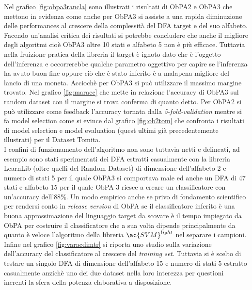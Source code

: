 Nel grafico \ref{fig:obpa3rancla} sono illustrati i risultati di \ac{ObPA}2 e \ac{ObPA}3 che mettono in evidenza come anche per \ac{ObPA}3 si assiste a una rapida diminuzione delle performances al crescere della complessità del \ac{DFA} target e del suo alfabeto. \\
Facendo un'analisi critica dei risultati si potrebbe concludere che anche il migliore degli algoritmi cioè \ac{ObPA}3 oltre 10 stati e alfabeto 5 non è più efficace. Tuttavia nella fruizione pratica della libreria il target è ignoto dato che è l'oggetto dell'inferenza e occorrerebbe qualche parametro oggettivo per capire se l'inferenza ha avuto buon fine oppure ciò che è stato inferito è a malapena migliore del lancio di una moneta.  Acciochè per \ac{ObPA}3 si può utilizzare il massimo margine trovato. Nel grafico \ref{fig:maracc} che mette in relazione l'accuracy di \ac{ObPA}3 sul random dataset con il margine  si trova conferma di quanto detto. Per \ac{ObPA}2 si può utilizzare come feedback l'accuracy tornata dalla \textit{5-fold-validation} mentre si fa model selection come si evince dal grafico \ref{fig:ob2tom} che confronta i risultati di model  selection e model evaluation (quest ultimi già precedentemente illustrati) per il Dataset Tomita. \\
I confini di funzionamento dell'algoritmo non sono tuttavia netti e delineati, ad esempio sono stati sperimentati dei \ac{DFA} estratti casualmente con la libreria LearnLib (oltre quelli del Random Dataset) di dimensione dell'alfabeto 2 e numero di stati 5 per il quale \ac{ObPA}3 si comportava male ed anche un \ac{DFA} di 47 stati e alfabeto 15 per il quale \ac{ObPA} 3 riesce a creare un classificatore con un'accuracy dell'$88\%$. Un modo empirico anche se privo di fondamento scientifico per rendersi conto  in \textit{release version} di \ac{ObPA} se il classificatore inferito è una buona approssimazione del linguaggio target da scovare è il tempo impiegato da \ac{ObPA} per costruire il classificatore che a sua volta dipende principalmente da quanto è veloce l'algoritmo della libreria $\ac{SVM}^{light}$ nel separare i campioni.\\
Infine nel grafico \ref{fig:varacdimtr} si riporta uno studio sulla variazione dell'accuracy del classificatore al crescere del \textit{training set}. Tuttavia si è scelto di testare un singolo \ac{DFA} di dimensione dell'alfabeto 15 e numero di stati 5 estratto casualmente anzichè uno dei due dataset nella loro interezza per questioni inerenti la sfera della potenza elaborativa a disposizione. 


